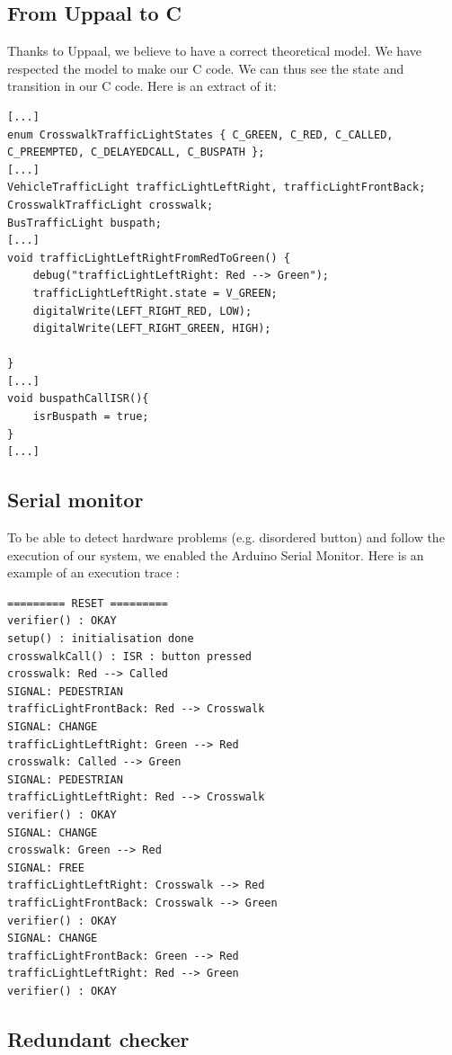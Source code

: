 \subsection{From Uppaal to C}

Thanks to Uppaal, we believe to have a correct theoretical model. We have respected the model to make our C code. We can thus see the state and transition in our C code. Here is an extract of it:

\begin{verbatim}
[...]
enum CrosswalkTrafficLightStates { C_GREEN, C_RED, C_CALLED, C_PREEMPTED, C_DELAYEDCALL, C_BUSPATH };
[...]
VehicleTrafficLight trafficLightLeftRight, trafficLightFrontBack;
CrosswalkTrafficLight crosswalk;
BusTrafficLight buspath;
[...]
void trafficLightLeftRightFromRedToGreen() {
    debug("trafficLightLeftRight: Red --> Green");
    trafficLightLeftRight.state = V_GREEN;
    digitalWrite(LEFT_RIGHT_RED, LOW);
    digitalWrite(LEFT_RIGHT_GREEN, HIGH);

}
[...]
void buspathCallISR(){
    isrBuspath = true;
}
[...]
\end{verbatim}


\subsection{Serial monitor}

To be able to detect hardware problems (e.g. disordered button) and follow the execution of our system, we enabled the Arduino Serial Monitor. Here is an example of an execution trace :

\begin{verbatim}
========= RESET =========
verifier() : OKAY
setup() : initialisation done
crosswalkCall() : ISR : button pressed
crosswalk: Red --> Called
SIGNAL: PEDESTRIAN
trafficLightFrontBack: Red --> Crosswalk
SIGNAL: CHANGE
trafficLightLeftRight: Green --> Red
crosswalk: Called --> Green
SIGNAL: PEDESTRIAN
trafficLightLeftRight: Red --> Crosswalk
verifier() : OKAY
SIGNAL: CHANGE
crosswalk: Green --> Red
SIGNAL: FREE
trafficLightLeftRight: Crosswalk --> Red
trafficLightFrontBack: Crosswalk --> Green
verifier() : OKAY
SIGNAL: CHANGE
trafficLightFrontBack: Green --> Red
trafficLightLeftRight: Red --> Green
verifier() : OKAY
\end{verbatim}

\subsection{Redundant checker}


